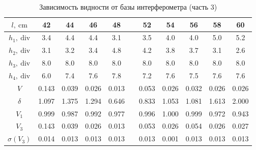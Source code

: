 \documentclass[12pt, a4paper]{article}
\begin{document}
\begin{table}[h!]
    \centering
    \caption{Зависимость видности от базы интерферометра (часть 3)}
    \begin{tabular}{|c|c|c|c|c|c|c|c|c|c|c|}
        \hline
        $l,~\mathrm{cm}$    & 42    & 44    & 46    & 48    &  & 52    & 54    & 56    & 58    & 60    \\
        \hline
        $h_1,~\mathrm{div}$ & 3.4   & 4.4   & 4.4   & 3.1   &  & 3.5   & 4.0   & 4.0   & 5.0   & 5.2   \\
        \hline
        $h_2,~\mathrm{div}$ & 3.1   & 3.2   & 3.4   & 4.8   &  & 4.2   & 3.8   & 3.7   & 3.1   & 2.6   \\
        \hline
        $h_3,~\mathrm{div}$ & 8.0   & 8.0   & 8.0   & 8.0   &  & 8.0   & 8.0   & 8.0   & 8.0   & 8.0   \\
        \hline
        $h_4,~\mathrm{div}$ & 6.0   & 7.4   & 7.6   & 7.8   &  & 7.2   & 7.6   & 7.5   & 7.6   & 7.6   \\
        \hline
        $V$                 & 0.143 & 0.039 & 0.026 & 0.013 &  & 0.053 & 0.026 & 0.032 & 0.026 & 0.026 \\
        \hline
        $\delta$            & 1.097 & 1.375 & 1.294 & 0.646 &  & 0.833 & 1.053 & 1.081 & 1.613 & 2.000 \\
        \hline
        $V_1$               & 0.999 & 0.987 & 0.992 & 0.977 &  & 0.996 & 1.000 & 0.999 & 0.972 & 0.943 \\
        \hline
        $V_3$               & 0.143 & 0.039 & 0.026 & 0.013 &  & 0.053 & 0.026 & 0.054 & 0.026 & 0.027 \\
        \hline
        $\sigma(V_3)$       & 0.014 & 0.013 & 0.013 & 0.013 &  & 0.013 & 0.001 & 0.013 & 0.013 & 0.013 \\
        \hline
    \end{tabular}
\end{table}
\end{document}
